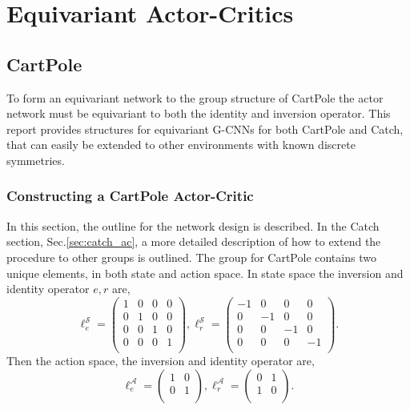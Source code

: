 \section{Equivariant Actor-Critics}\label{sec:actor-critic}
\subsection{CartPole}

To form an equivariant network to the group structure of CartPole the actor network must be equivariant to both the identity and inversion operator. This report provides structures for equivariant G-CNNs for both CartPole and Catch, that can easily be extended to other environments with known discrete symmetries.

\subsubsection{Constructing a CartPole Actor-Critic}
In this section, the outline for the network design is described. In the Catch section, Sec.\ref{sec:catch_ac}, a more detailed description of how to extend the procedure to other groups is outlined.
The group for CartPole contains two unique elements, in both state and action space. In state space the inversion and identity operator $e, r$ are,
\begin{equation}
	\ell^\mathcal{S}_e =
	\begin{pmatrix}
		1 & 0 & 0 & 0 \\
		0 & 1 & 0 & 0 \\
		0 & 0 & 1 & 0 \\
		0 & 0 & 0 & 1 \\
	\end{pmatrix},
	\ell^\mathcal{S}_r =
	\begin{pmatrix}
		-1 & 0  & 0  & 0  \\
		0  & -1 & 0  & 0  \\
		0  & 0  & -1 & 0  \\
		0  & 0  & 0  & -1 \\
	\end{pmatrix}.
\end{equation}
Then the action space, the inversion and identity operator are,
\begin{equation}
	\ell^\mathcal{A}_e =
	\begin{pmatrix}
		1 & 0 \\
		0 & 1 \\
	\end{pmatrix},
	\ell^\mathcal{A}_r =
	\begin{pmatrix}
		0 & 1 \\
		1 & 0 \\
	\end{pmatrix}.
\end{equation}
